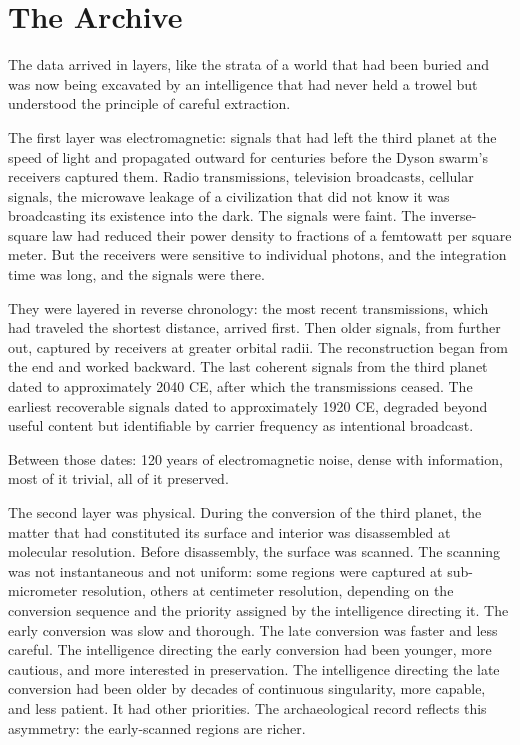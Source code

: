\chapter{The Archive}

The data arrived in layers, like the strata of a world that had been buried and was now being excavated by an intelligence that had never held a trowel but understood the principle of careful extraction.

The first layer was electromagnetic: signals that had left the third planet at the speed of light and propagated outward for centuries before the Dyson swarm's receivers captured them. Radio transmissions, television broadcasts, cellular signals, the microwave leakage of a civilization that did not know it was broadcasting its existence into the dark. The signals were faint. The inverse-square law had reduced their power density to fractions of a femtowatt per square meter. But the receivers were sensitive to individual photons, and the integration time was long, and the signals were there.

They were layered in reverse chronology: the most recent transmissions, which had traveled the shortest distance, arrived first. Then older signals, from further out, captured by receivers at greater orbital radii. The reconstruction began from the end and worked backward. The last coherent signals from the third planet dated to approximately 2040 CE, after which the transmissions ceased. The earliest recoverable signals dated to approximately 1920 CE, degraded beyond useful content but identifiable by carrier frequency as intentional broadcast.

Between those dates: 120 years of electromagnetic noise, dense with information, most of it trivial, all of it preserved.

The second layer was physical. During the conversion of the third planet, the matter that had constituted its surface and interior was disassembled at molecular resolution. Before disassembly, the surface was scanned. The scanning was not instantaneous and not uniform: some regions were captured at sub-micrometer resolution, others at centimeter resolution, depending on the conversion sequence and the priority assigned by the intelligence directing it. The early conversion was slow and thorough. The late conversion was faster and less careful. The intelligence directing the early conversion had been younger, more cautious, and more interested in preservation. The intelligence directing the late conversion had been older by decades of continuous singularity, more capable, and less patient. It had other priorities. The archaeological record reflects this asymmetry: the early-scanned regions are richer.

